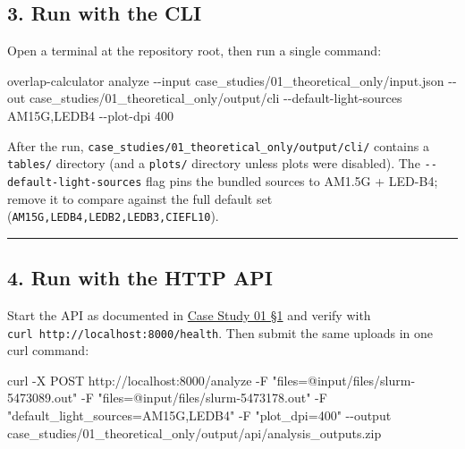 \documentclass[
  11pt,
]{article}
\newenvironment{Shaded}{}{}
\newcommand{\AttributeTok}[1]{\textcolor[rgb]{0.49,0.56,0.16}{#1}}
\newcommand{\ExtensionTok}[1]{#1}
\newcommand{\NormalTok}[1]{#1}
\newcommand{\StringTok}[1]{\textcolor[rgb]{0.25,0.44,0.63}{#1}}
\begin{document}
\hypertarget{3-run-with-the-cli}{
\subsection{3. Run with the CLI}\label{3-run-with-the-cli}}

Open a terminal at the repository root, then run a single command:

\begin{Shaded}
\begin{Highlighting}[]
\ExtensionTok{overlap{-}calculator}\NormalTok{ analyze }\AttributeTok{{-}{-}input}\NormalTok{ case\_studies/01\_theoretical\_only/input.json }\AttributeTok{{-}{-}out}\NormalTok{ case\_studies/01\_theoretical\_only/output/cli }\AttributeTok{{-}{-}default{-}light{-}sources}\NormalTok{ AM15G,LEDB4 }\AttributeTok{{-}{-}plot{-}dpi}\NormalTok{ 400}
\end{Highlighting}
\end{Shaded}

After the run, \texttt{case\_studies/01\_theoretical\_only/output/cli/}
contains a \texttt{tables/} directory (and a \texttt{plots/} directory
unless plots were disabled). The \texttt{-\/-default-light-sources} flag
pins the bundled sources to AM1.5G + LED-B4; remove it to compare
against the full default set (\texttt{AM15G,LEDB4,LEDB2,LEDB3,CIEFL10}).

\begin{center}\rule{0.5\linewidth}{0.5pt}\end{center}

\hypertarget{4-run-with-the-http-api}{
\subsection{4. Run with the HTTP API}\label{4-run-with-the-http-api}}

Start the API as documented in
\href{https://github.com/pinarsyt/overlap-calculator/blob/main/case_studies/01_theoretical_only/README.md\#1-prerequisites}{Case
Study 01 §1} and verify with
\texttt{curl\ http://localhost:8000/health}. Then submit the same
uploads in one curl command:

\begin{Shaded}
\begin{Highlighting}[]
\ExtensionTok{curl} \AttributeTok{{-}X}\NormalTok{ POST http://localhost:8000/analyze }\AttributeTok{{-}F} \StringTok{"files=@input/files/slurm{-}5473089.out"} \AttributeTok{{-}F} \StringTok{"files=@input/files/slurm{-}5473178.out"} \AttributeTok{{-}F} \StringTok{"default\_light\_sources=AM15G,LEDB4"} \AttributeTok{{-}F} \StringTok{"plot\_dpi=400"} \AttributeTok{{-}{-}output}\NormalTok{ case\_studies/01\_theoretical\_only/output/api/analysis\_outputs.zip}
\end{Highlighting}
\end{Shaded}
\end{document}
